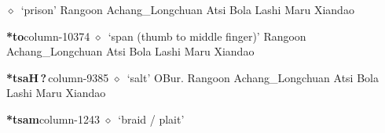          $\diamond$~`prison'
         Rangoon 
\hspace{1ex}
         Achang\_Longchuan 
\hspace{1ex}
         Atsi 
\hspace{1ex}
         Bola 
\hspace{1ex}
         Lashi 
\hspace{1ex}
         Maru 
\hspace{1ex}
         Xiandao 
  \item {\footnotesize \textbf{*to}}{\tiny column-10374}
         $\diamond$~`span (thumb to middle finger)'
         Rangoon 
\hspace{1ex}
         Achang\_Longchuan 
\hspace{1ex}
         Atsi 
\hspace{1ex}
         Bola 
\hspace{1ex}
         Lashi 
\hspace{1ex}
         Maru 
\hspace{1ex}
         Xiandao 
  \item {\footnotesize \textbf{*tsaH\,?\,}}{\tiny column-9385}
         $\diamond$~`salt'
         OBur. 
\hspace{1ex}
         Rangoon 
\hspace{1ex}
         Achang\_Longchuan 
\hspace{1ex}
         Atsi 
\hspace{1ex}
         Bola 
\hspace{1ex}
         Lashi 
\hspace{1ex}
         Maru 
\hspace{1ex}
         Xiandao 
  \item {\footnotesize \textbf{*tsam}}{\tiny column-1243}
         $\diamond$~`braid / plait'
